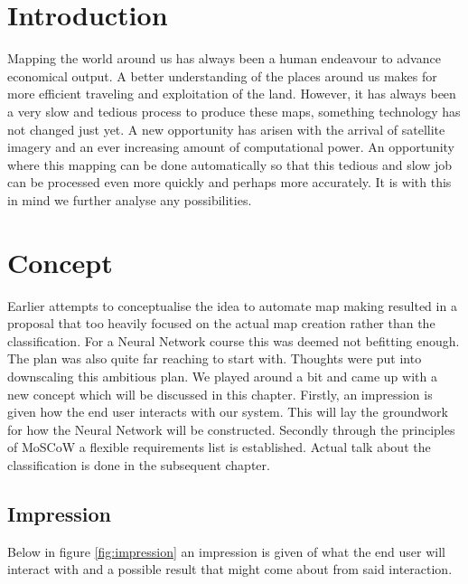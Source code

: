 \documentclass[a4paper,onecolumn]{report}
\begin{document}
\tableofcontents

\chapter{Introduction}

Mapping the world around us has always been a human endeavour to advance economical output. A better understanding of the places around us makes for more efficient traveling and exploitation of the land. However, it has always been a very slow and tedious process to produce these maps, something technology has not changed just yet. A new opportunity has arisen with the arrival of satellite imagery and an ever increasing amount of computational power. An opportunity where this mapping can be done automatically so that this tedious and slow job can be processed even more quickly and perhaps more accurately. It is with this in mind we further analyse any possibilities.\\


\chapter{Concept}
Earlier attempts to conceptualise the idea to automate map making resulted in a proposal that too heavily focused on the actual map creation rather than the classification. For a Neural Network course this was deemed not befitting enough. The plan was also quite far reaching to start with. Thoughts were put into downscaling this ambitious plan. We played around a bit and came up with a new concept which will be discussed in this chapter. Firstly, an impression is given how the end user interacts with our system. This will lay the groundwork for how the Neural Network will be constructed. Secondly through the principles of MoSCoW a flexible requirements list is established. Actual talk about the classification is done in the subsequent chapter.

\section{Impression}

Below in figure \ref{fig:impression} an impression is given of what the end user will interact with and a possible result that might come about from said interaction.\\
\end{document}
